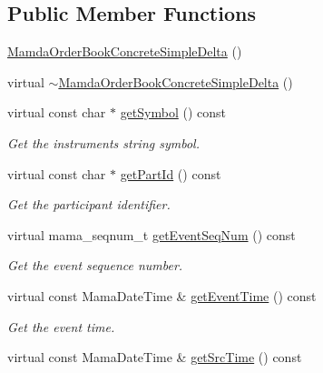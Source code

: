 \subsection*{Public Member Functions}
\begin{CompactItemize}
\item 
\hyperlink{classWombat_1_1MamdaOrderBookConcreteSimpleDelta_fda301bf680626128766a84eab9bd680}{Mamda\-Order\-Book\-Concrete\-Simple\-Delta} ()
\item 
virtual \hyperlink{classWombat_1_1MamdaOrderBookConcreteSimpleDelta_aaeb5af7e63b8d3915dce1b07c958cf6}{$\sim$Mamda\-Order\-Book\-Concrete\-Simple\-Delta} ()
\item 
virtual const char $\ast$ \hyperlink{classWombat_1_1MamdaOrderBookConcreteSimpleDelta_93de17fbb8e02253ea7c67e19c2da6a4}{get\-Symbol} () const 
\begin{CompactList}\small\item\em Get the instruments string symbol. \item\end{CompactList}\item 
virtual const char $\ast$ \hyperlink{classWombat_1_1MamdaOrderBookConcreteSimpleDelta_ae9efb06f1eeb2d5bd36c97639703627}{get\-Part\-Id} () const 
\begin{CompactList}\small\item\em Get the participant identifier. \item\end{CompactList}\item 
virtual mama\_\-seqnum\_\-t \hyperlink{classWombat_1_1MamdaOrderBookConcreteSimpleDelta_26416a9ac3afef654acc376abb484506}{get\-Event\-Seq\-Num} () const 
\begin{CompactList}\small\item\em Get the event sequence number. \item\end{CompactList}\item 
virtual const Mama\-Date\-Time \& \hyperlink{classWombat_1_1MamdaOrderBookConcreteSimpleDelta_729cedfe13cf6a6036be192c85e518bd}{get\-Event\-Time} () const 
\begin{CompactList}\small\item\em Get the event time. \item\end{CompactList}\item 
virtual const Mama\-Date\-Time \& \hyperlink{classWombat_1_1MamdaOrderBookConcreteSimpleDelta_47e5a10b4cdcaa31db65651bbbafd159}{get\-Src\-Time} () const 

\end{CompactItemize}
